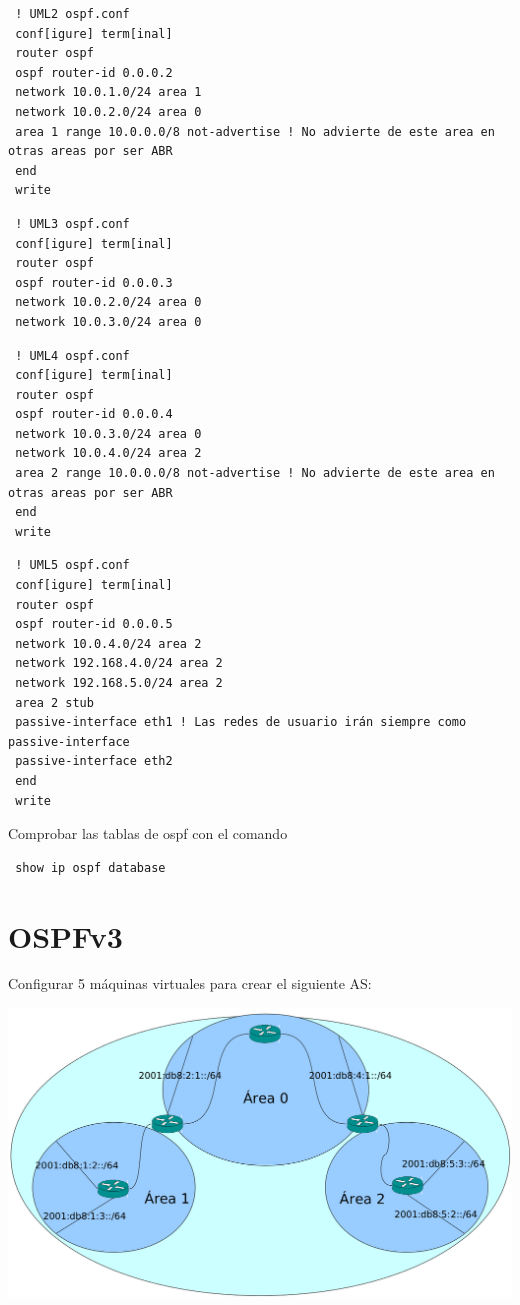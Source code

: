 \documentclass{article}
\begin{document}
\begin{verbatim}
 ! UML2 ospf.conf
 conf[igure] term[inal]
 router ospf
 ospf router-id 0.0.0.2
 network 10.0.1.0/24 area 1
 network 10.0.2.0/24 area 0
 area 1 range 10.0.0.0/8 not-advertise ! No advierte de este area en otras areas por ser ABR
 end
 write
\end{verbatim}

\begin{verbatim}
 ! UML3 ospf.conf
 conf[igure] term[inal]
 router ospf
 ospf router-id 0.0.0.3
 network 10.0.2.0/24 area 0
 network 10.0.3.0/24 area 0

\end{verbatim}

\begin{verbatim}
 ! UML4 ospf.conf
 conf[igure] term[inal]
 router ospf
 ospf router-id 0.0.0.4
 network 10.0.3.0/24 area 0
 network 10.0.4.0/24 area 2
 area 2 range 10.0.0.0/8 not-advertise ! No advierte de este area en otras areas por ser ABR
 end
 write
\end{verbatim}

\begin{verbatim}
 ! UML5 ospf.conf
 conf[igure] term[inal]
 router ospf
 ospf router-id 0.0.0.5
 network 10.0.4.0/24 area 2
 network 192.168.4.0/24 area 2
 network 192.168.5.0/24 area 2
 area 2 stub
 passive-interface eth1 ! Las redes de usuario irán siempre como passive-interface
 passive-interface eth2
 end
 write
\end{verbatim}

Comprobar las tablas de ospf con el comando

\begin{verbatim}
 show ip ospf database
\end{verbatim}

\newpage
\section{OSPFv3}
Configurar 5 máquinas virtuales para crear el siguiente AS:

\includegraphics[width=\textwidth]{ospfv3}
\end{document}
